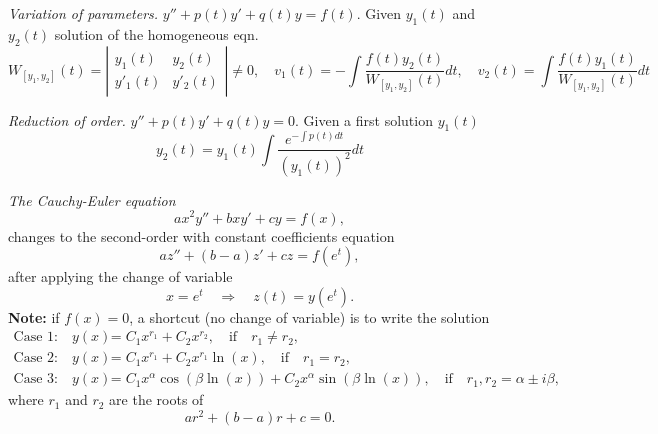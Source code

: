 \documentclass[11pt]{article}
\begin{document}
\begin{preamble}
\begin{formulaitem}
\item \textsl{Variation of parameters.} $y''+p(t)y'+q(t)y=f(t)$. Given $y_{1}(t)$ and $y_{2}(t)$ solution of the homogeneous eqn.
\[\boxed{W_{[y_{1}, y_{2}]}(t)=\left| \begin{array}{cc}y_{1}(t) & y_{2}(t) \\ y'_{1}(t) & y'_{2}(t) \end{array} \right| \neq 0 , \quad v_{1}(t)=-\int \frac{f(t)y_{2}(t)}{W_{[y_{1}, y_{2}]}(t)}dt , \quad v_{2}(t)= \int \frac{f(t)y_{1}(t)}{W_{[y_{1}, y_{2}]}(t)}dt}\]

\item \textsl{Reduction of order.} $y''+p(t)y'+q(t)y=0$. Given a first solution $y_{1}(t)$
\[\boxed{y_{2}(t)=y_{1}(t)\int\frac{e^{-\int p(t) dt}}{(y_{1}(t))^{2}}dt}\]

\item \textsl{The Cauchy-Euler equation} \[a x^{2}y'' +bxy' + c y = f(x),\] changes to the second-order with constant coefficients equation \[az'' +(b-a)z'+cz=f(e^{t}),\] after applying the change of variable \[x = e^{t} \quad \Rightarrow \quad z(t) = y(e^{t}).\]
\textbf{Note:} if $f(x)=0$, a shortcut (no change of variable) is to write the solution 
\begin{align*}
\text{Case 1:} \quad y(x)&=C_{1}x^{r_{1}}+C_{2}x^{r_{2}}, \quad \text{if}\quad r_{1}\neq r_{2}, \\
\text{Case 2:} \quad y(x)&=C_{1}x^{r_{1}}+C_{2}x^{r_{1}}\ln (x), \quad \text{if}\quad r_{1}= r_{2}, \\
\text{Case 3:} \quad y(x)&=C_{1}x^{\alpha}\cos(\beta \ln (x) )+C_{2}x^{\alpha}\sin(\beta \ln (x) ), \quad \text{if}\quad r_{1}, r_{2} = \alpha \pm i \beta,
\end{align*}
where $r_{1}$ and $r_{2}$ are the roots of \[ar^{2}+(b-a)r+c=0.\]


\end{formulaitem}


\end{preamble}

%      
\end{document}
